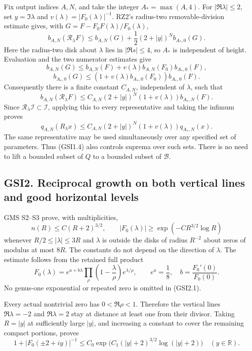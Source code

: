 Fix output indices \(A,N\), and take the integer \(A_*=\max(A,4)\). For
\(|\Re\lambda|\le2\), set \(y=\Im\lambda\) and
\(v(\lambda)=|F_0(\lambda)|^{-1}\). RZ2's radius-two removable-division
estimate gives, with \(G=F-F_0F(\lambda)/F_0(\lambda)\), \[
b_{A,N}(\mathscr R_\lambda F)
\le b_{A,N}(G)+\frac12(2+|y|)^N b_{A_*,0}(G).
\tag{GSI1.1}
\] Here the radius-two disk about \(\lambda\) lies in \(|\Re s|\le4\),
so \(A_*\) is independent of height. Evaluation and the two numerator
estimates give \[
b_{A,N}(G)\le b_{A,N}(F)
+v(\lambda)b_{A,N}(F_0)b_{A_*,0}(F),
\] \[
b_{A_*,0}(G)\le
(1+v(\lambda)b_{A_*,0}(F_0))b_{A_*,0}(F).
\tag{GSI1.2}
\] Consequently there is a finite constant \(C_{A,N}\), independent of
\(\lambda\), such that \[
b_{A,N}(\mathscr R_\lambda F)
\le C_{A,N}(2+|y|)^N(1+v(\lambda))b_{A_*,N}(F).
\tag{GSI1.3}
\] Since \(\mathscr R_\lambda\mathcal I\subset\mathcal I\), applying
this to every representative and taking the infimum proves \[
q_{A,N}(R_\lambda x)
\le C_{A,N}(2+|y|)^N(1+v(\lambda))q_{A_*,N}(x).
\tag{GSI1.4}
\] The same representative may be used simultaneously over any specified
set of parameters. Thus (GSI1.4) also controls suprema over such sets.
There is no need to lift a bounded subset of \(Q\) to a bounded subset
of \(\mathcal B\).

\subsection{GSI2. Reciprocal growth on both vertical lines and good
horizontal
levels}\label{gsi2.-reciprocal-growth-on-both-vertical-lines-and-good-horizontal-levels}

GMS S2--S3 prove, with multiplicities, \[
n(R)\le C(R+2)^{3/2},\qquad
|F_0(\lambda)|\ge\exp(-C R^{3/2}\log R)
\tag{GSI2.1}
\] whenever \(R/2\le|\lambda|\le3R\) and \(\lambda\) is outside the
disks of radius \(R^{-2}\) about zeros of modulus at most \(8R\). The
constants do not depend on the direction of \(\lambda\). The estimate
follows from the retained full product \[
F_0(\lambda)=e^{a+b\lambda}
\prod_{\rho}\left(1-\frac\lambda\rho\right)e^{\lambda/\rho},
\qquad e^a=\frac18,\quad b=\frac{F_0'(0)}{F_0(0)}.
\tag{GSI2.2}
\] No genus-one exponential or repeated zero is omitted in (GSI2.1).

Every actual nontrivial zero has \(0<\Re\rho<1\). Therefore the vertical
lines \(\Re\lambda=-2\) and \(\Re\lambda=2\) stay at distance at least
one from their divisor. Taking \(R=|y|\) at sufficiently large \(|y|\),
and increasing a constant to cover the remaining compact portions,
proves \[
1+|F_0(\pm2+iy)|^{-1}
\le C_0\exp\bigl(C_1(|y|+2)^{3/2}\log(|y|+2)\bigr)
\quad(y\in\mathbb R).
\tag{GSI2.3}
\]

